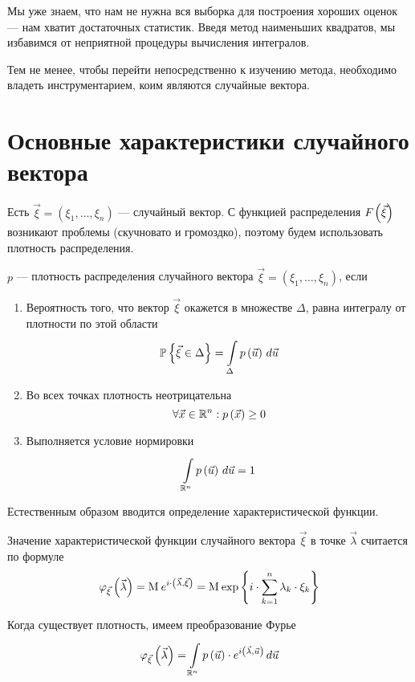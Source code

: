Мы уже знаем, что нам не нужна вся выборка для построения хороших оценок ---
нам хватит достаточных статистик. Введя метод наименьших квадратов,
мы избавимся от неприятной процедуры вычисления интегралов.

Тем не менее, чтобы перейти непосредственно к изучению метода, необходимо
владеть инструментарием, коим являются случайные вектора.

\section{Основные характеристики случайного вектора}

Есть $\vec{\xi} = \left( \xi_1, \dots, \xi_n \right)$ --- случайный вектор.
С функцией распределения $\cdf{\vec{\xi}}$ возникают проблемы (скучновато и
громоздко), поэтому будем использовать плотность распределения.

\begin{definition}
    $p$ --- плотность распределения случайного вектора
    $\vec{\xi} = \left( \xi_1, \dots, \xi_n \right)$, если
    \begin{enumerate}
        \item Вероятность того, что вектор $\vec{\xi}$ окажется
            в множестве $\Delta$, равна интегралу от плотности по этой области
            $$\Probability{\vec{\xi} \in \Delta}
                = \integrall{\Delta}{d\vec{u}}{\pdf{\vec{u}}}$$
        \item Во всех точках плотность неотрицательна
            $$\forall \vec{x} \in \mathbb{R}^n: \pdf{\vec{x}} \ge 0$$
        \item Выполняется условие нормировки
            $$\integrall{\mathbb{R}^n}{d\vec{u}}{\pdf{\vec{u}}} = 1$$
    \end{enumerate}
\end{definition}

Естественным образом вводится определение характеристической функции.

\begin{definition}
    \label{def:characteristicFunction}
    Значение характеристической функции случайного вектора $\vec{\xi}$
    в точке $\vec{\lambda}$ считается по формуле
    $$\varphi_{\vec{\xi}}\left( \vec{\lambda} \right)
        = \mean{e^{i \cdot \left( \vec{\lambda}, \vec{\xi} \right)}}
        = \mean{
            \exp{\left\{ i \cdot \sum_{k=1}^n \lambda_k \cdot \xi_k \right\}}}$$

    Когда существует плотность, имеем преобразование Фурье
    $$\varphi_{\vec{\xi}}\left( \vec{\lambda} \right)
        = \integrall{\mathbb{R}^n}{d\vec{u}}{\pdf{\vec{u}} \cdot
            e^{i \left( \vec{\lambda}, \vec{u} \right)}}$$
\end{definition}

